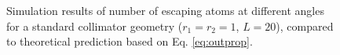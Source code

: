 \documentclass[10pt,a4paper]{article}
\begin{document}
\begin{figure}[ht]
\centering
{}
\caption{Simulation results of number of escaping atoms at different angles for a standard collimator geometry ($r_1 = r_2 = 1$, $L = 20$), compared to theoretical prediction based on Eq. \ref{eq:outprop}.}
\label{fig:simresult}
\end{figure}
\end{document}
